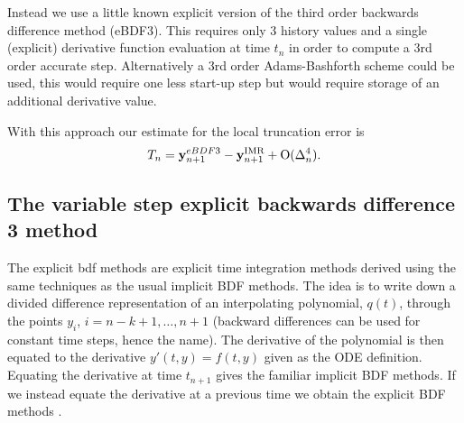 Instead we use a little known explicit version of the third order backwards difference method (eBDF3).
This requires only 3 history values and a single (explicit) derivative function evaluation at time $t_n$ in order to compute a 3rd order accurate step.
Alternatively a 3rd order Adams-Bashforth scheme could be used, this would require one less start-up step but would require storage of an additional derivative value.

With this approach our estimate for the local truncation error is
\begin{equation}
  \label{eq:aimr-lte-est}
  T_n = \mathbf{y}_{n+1}^{eBDF3} - \mathbf{y}_{n+1}^{\text{IMR}} + \text{O}(\Delta_{n}^4).
\end{equation}


\subsection{The variable step explicit backwards difference 3 method}


The explicit bdf methods are explicit time integration methods derived using the same techniques as the usual implicit BDF methods.
The idea is to write down a divided difference representation of an interpolating polynomial, $q(t)$, through the points $y_i$, $i=n-k+1, \ldots, n+1$ (backward differences can be used for constant time steps, hence the name).
The derivative of the polynomial is then equated to the derivative $y'(t, y) = f(t, y)$ given as the ODE definition\cite[pg. 400]{HairerNorsettWanner}.
Equating the derivative at time $t_{n+1}$ gives the familiar implicit BDF methods.
If we instead equate the derivative at a previous time we obtain the explicit BDF methods \cite[pg. 364]{HairerNorsettWanner}.

